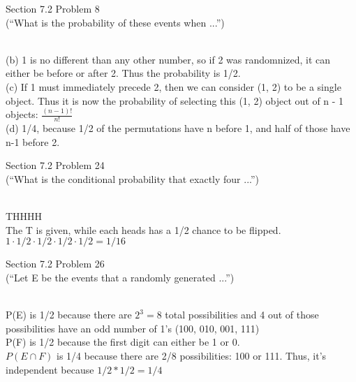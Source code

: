 \documentclass[11pt]{exam}
\begin{document}
\begin{questions}
\begin{solution}
\end{solution}
\question[6] Section 7.2 Problem 8\\
(“What is the probability of these events when ...”) 
\begin{solution}\\
(b) 1 is no different than any other number, so if 2 was randomnized, it can either be before or after 2. Thus the probability is 1/2. \\
(c) If 1 must immediately precede 2, then we can consider (1, 2) to be a single object. Thus it is now the probability of selecting this (1, 2) object out of n - 1 objects: $\frac{(n - 1)!}{n!}$ \\
(d) 1/4, because 1/2 of the permutations have n before 1, and half of those have n-1 before 2.
\end{solution}
\question[2] Section 7.2 Problem 24\\
(“What is the conditional probability that exactly four ...”) 
\begin{solution}\\
THHHH \\
The T is given, while each heads has a 1/2 chance to be flipped. \\ $1 \cdot 1/2 \cdot 1/2 \cdot 1/2 \cdot 1/2 = 1/16$ 
\end{solution}
\question[2] Section 7.2 Problem 26\\
(“Let E be the events that a randomly generated ...”) 
\begin{solution}\\
P(E) is 1/2 because there are $2^3 = 8$ total possibilities and 4 out of those possibilities have an odd number of 1's (100, 010, 001, 111) \\
P(F) is 1/2 because the first digit can either be 1 or 0. \\
$P(E \cap F)$ is 1/4 because there are 2/8 possibilities: 100 or 111. Thus, it's independent because $1/2 * 1/2 = 1/4$
\end{solution}

\end{questions}
\end{document}
